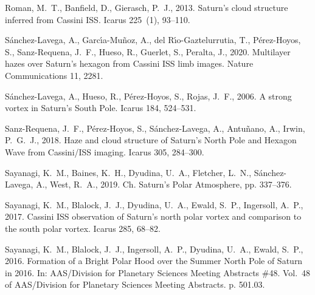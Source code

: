 \documentclass[article,11pt]{emulateapj}
\begin{document}
\begin{thebibliography}{85}
{Roman}, M.~T., {Banfield}, D., {Gierasch}, P.~J., 2013. {Saturn's cloud
  structure inferred from Cassini ISS}. Icarus 225~(1), 93--110.

{S{\'a}nchez-Lavega}, A., {Garc{\'\i}a-Mu{\~n}oz}, A., {del
  R{\'\i}o-Gaztelurrutia}, T., {P{\'e}rez-Hoyos}, S., {Sanz-Requena}, J.~F.,
  {Hueso}, R., {Guerlet}, S., {Peralta}, J., 2020. {Multilayer hazes over
  Saturn's hexagon from Cassini ISS limb images}. Nature Communications 11,
  2281.

{S{\'a}nchez-Lavega}, A., {Hueso}, R., {P{\'e}rez-Hoyos}, S., {Rojas}, J.~F.,
  2006. {A strong vortex in Saturn's South Pole}. Icarus 184, 524--531.

{Sanz-Requena}, J.~F., {P{\'e}rez-Hoyos}, S., {S{\'a}nchez-Lavega}, A.,
  {Antu{\~n}ano}, A., {Irwin}, P.~G.~J., 2018. {Haze and cloud structure of
  Saturn's North Pole and Hexagon Wave from Cassini/ISS imaging}. Icarus 305,
  284--300.

{Sayanagi}, K.~M., {Baines}, K.~H., {Dyudina}, U.~A., {Fletcher}, L.~N.,
  {S{\'a}nchez-Lavega}, A., {West}, R.~A., 2019. Ch. {Saturn's Polar
  Atmosphere}, pp. 337--376.

{Sayanagi}, K.~M., {Blalock}, J.~J., {Dyudina}, U.~A., {Ewald}, S.~P.,
  {Ingersoll}, A.~P., 2017. {Cassini ISS observation of Saturn's north polar
  vortex and comparison to the south polar vortex}. Icarus 285, 68--82.

{Sayanagi}, K.~M., {Blalock}, J.~J., {Ingersoll}, A.~P., {Dyudina}, U.~A.,
  {Ewald}, S.~P., 2016. {Formation of a Bright Polar Hood over the Summer North
  Pole of Saturn in 2016}. In: AAS/Division for Planetary Sciences Meeting
  Abstracts \#48. Vol.~48 of AAS/Division for Planetary Sciences Meeting
  Abstracts. p. 501.03.


\end{thebibliography}
\end{document}
